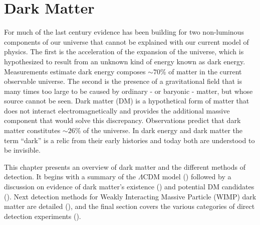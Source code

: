 




\pagestyle{cu}
\graphicspath{{./Chapter1/Figures/}}
\chapter[Dark Matter][Dark Matter]{Dark Matter}
\label{chap:dark_matter}

For much of the last century evidence has been building for two non-luminous components of our universe that cannot be explained with
our current model of physics.  The first is the acceleration of the expansion of the universe, which is hypothesized to result from an
unknown kind of energy known as dark energy.  Measurements estimate dark energy composes ${\sim}70$\% of
matter in the current observable universe.  The second is the presence of a gravitational field that is many times too large to be caused
by ordinary - or baryonic - matter, but whose source cannot be seen.  Dark matter (DM) is a hypothetical form of matter that does not
interact electromagnetically and provides the additional massive component that would solve this discrepancy.  Observations predict that
dark matter
constitutes ${\sim}26$\% of the universe.  In dark energy and dark matter the term ``dark'' is a relic from their early histories and
today both are understood to be invisible.

This chapter presents an overview of dark matter and the different methods of detection.  It begins with a summary of the
$\Lambda \mathrm{CDM}$ model () followed by a discussion on evidence of dark matter's existence
() and potential DM candidates ().  Next detection methods for Weakly
Interacting Massive Particle (WIMP) dark matter are detailed (), and the final section covers the various
categories of direct detection experiments ().



